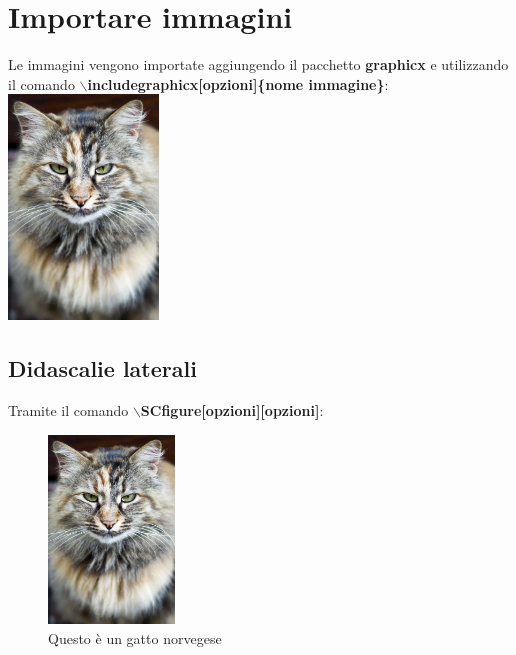 \documentclass[a4paper, 12pt]{book}
\theoremstyle{plain}
\begin{document}
	\section{Importare immagini}
	Le immagini vengono importate aggiungendo il pacchetto
	\textbf{graphicx} e utilizzando il comando \textbf{$\backslash$includegraphicx[opzioni]\{nome immagine\}}:\\
	\includegraphics[width=0.3\textwidth]{cat.jpeg}

	\subsection{Didascalie laterali}
	Tramite il comando \textbf{$\backslash$SCfigure[opzioni][opzioni]}:
	\begin{figure}
		\includegraphics[width=0.3\textwidth]{cat.jpeg}
		\caption{Questo è un gatto norvegese}
	\end{figure}
\end{document}
